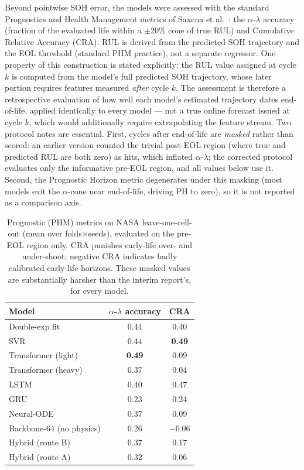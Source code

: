 Beyond pointwise SOH error, the models were assessed with the standard
Prognostics and Health Management metrics of Saxena et al.~\cite{saxena_metrics}:
the $\alpha$-$\lambda$ accuracy (fraction of the evaluated life within a
$\pm20\%$ cone of true RUL) and Cumulative Relative Accuracy (CRA). RUL is derived from the predicted SOH trajectory and the EOL
threshold (standard PHM practice), not a separate regressor. One property of
this construction is stated explicitly: the RUL value assigned at cycle $k$ is
computed from the model's full predicted SOH trajectory, whose later portion
requires features measured \emph{after} cycle $k$. The assessment is therefore
a retrospective evaluation of how well each model's estimated trajectory dates
end-of-life, applied identically to every model --- not a true online forecast
issued at cycle $k$, which would additionally require extrapolating the
feature stream. Two protocol notes
are essential. First, cycles after end-of-life are \emph{masked} rather than
scored: an earlier version counted the trivial post-EOL region (where true and
predicted RUL are both zero) as hits, which inflated $\alpha$-$\lambda$; the
corrected protocol evaluates only the informative pre-EOL region, and all values
below use it. Second, the Prognostic Horizon metric degenerates under this
masking (most models exit the $\alpha$-cone near end-of-life, driving PH to
zero), so it is not reported as a comparison axis.

\begin{table}[H]
\centering
\caption{Prognostic (PHM) metrics on NASA leave-one-cell-out (mean over
folds$\times$seeds), evaluated on the pre-EOL region only. CRA punishes early-life
over- and under-shoot; negative CRA indicates badly calibrated early-life
horizons. These masked values are substantially harsher than the interim
report's, for every model.}
\label{tab:phm}
\small
\begin{tabular}{l c c}
\toprule
\textbf{Model} & \textbf{$\alpha$-$\lambda$ accuracy} & \textbf{CRA} \\
\midrule
Double-exp fit        & 0.44 & 0.40 \\
SVR                   & 0.44 & \textbf{0.49} \\
Transformer (light)   & \textbf{0.49} & 0.09 \\
Transformer (heavy)   & 0.37 & 0.04 \\
LSTM                  & 0.40 & 0.47 \\
GRU                   & 0.23 & 0.24 \\
Neural-ODE            & 0.37 & 0.09 \\
Backbone-64 (no physics) & 0.26 & $-0.06$ \\
Hybrid (route B)      & 0.37 & 0.17 \\
Hybrid (route A)      & 0.32 & 0.06 \\
\bottomrule
\end{tabular}
\end{table}

